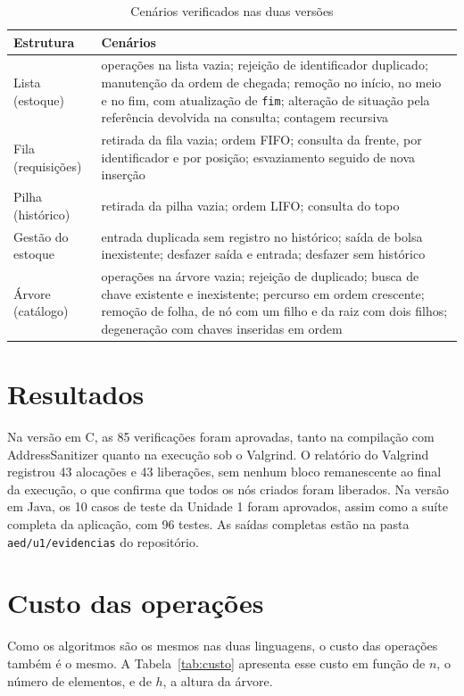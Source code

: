 \documentclass[12pt,a4paper,oneside]{report}
\newcommand{\fonte}[1][Elaborado pelos autores (2026).]{\par\vspace{2pt}{\centering\small Fonte: #1\par}\vspace{6pt}}
\newcommand{\cod}[1]{\texttt{#1}}
\begin{document}
\begin{table}[H]
\caption{Cenários verificados nas duas versões}
\label{tab:testes}
\small
\begin{tabularx}{\textwidth}{@{}p{3.2cm}X@{}}
\toprule
\textbf{Estrutura} & \textbf{Cenários} \\
\midrule
Lista (estoque) & operações na lista vazia; rejeição de identificador duplicado; manutenção da ordem de chegada; remoção no início, no meio e no fim, com atualização de \cod{fim}; alteração de situação pela referência devolvida na consulta; contagem recursiva \\
Fila (requisições) & retirada da fila vazia; ordem FIFO; consulta da frente, por identificador e por posição; esvaziamento seguido de nova inserção \\
Pilha (histórico) & retirada da pilha vazia; ordem LIFO; consulta do topo \\
Gestão do estoque & entrada duplicada sem registro no histórico; saída de bolsa inexistente; desfazer saída e entrada; desfazer sem histórico \\
Árvore (catálogo) & operações na árvore vazia; rejeição de duplicado; busca de chave existente e inexistente; percurso em ordem crescente; remoção de folha, de nó com um filho e da raiz com dois filhos; degeneração com chaves inseridas em ordem \\
\bottomrule
\end{tabularx}
\fonte
\end{table}

\section{Resultados}

Na versão em C, as 85 verificações foram aprovadas, tanto na compilação com AddressSanitizer quanto na execução sob o Valgrind. O relatório do Valgrind registrou 43 alocações e 43 liberações, sem nenhum bloco remanescente ao final da execução, o que confirma que todos os nós criados foram liberados. Na versão em Java, os 10 casos de teste da Unidade 1 foram aprovados, assim como a suíte completa da aplicação, com 96 testes. As saídas completas estão na pasta \cod{aed/u1/evidencias} do repositório.

\section{Custo das operações}

Como os algoritmos são os mesmos nas duas linguagens, o custo das operações também é o mesmo. A Tabela~\ref{tab:custo} apresenta esse custo em função de $n$, o número de elementos, e de $h$, a altura da árvore.
\end{document}
